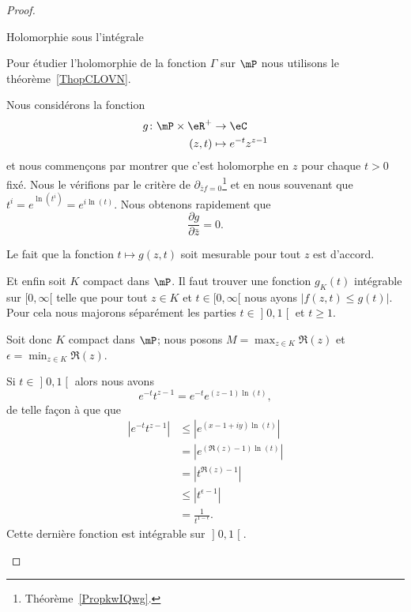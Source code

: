 \begin{proof}
    \begin{subproof}
        \item[Holomorphie sous l'intégrale]

            Pour étudier l'holomorphie de la fonction \( \Gamma\) sur \( \mP\) nous utilisons le théorème~\ref{ThopCLOVN}.

            Nous considérons la fonction
            \begin{equation}
                \begin{aligned}
                    g\colon \mP\times \eR^+&\to \eC \\
                    (z,t)&\mapsto  e^{-t}z^{z-1}
                \end{aligned}
            \end{equation}
            et nous commençons par montrer que c'est holomorphe en \( z\) pour chaque \( t>0\) fixé. Nous le vérifions par le critère de \( \partial_{\bar zf=0}\)\footnote{Théorème~\ref{PropkwIQwg}.} et en nous souvenant que \( t^i= e^{\ln(t^i)}= e^{i\ln(t)}\). Nous obtenons rapidement que
            \begin{equation}
                \frac{ \partial g }{ \partial \bar z }=0.
            \end{equation}

            Le fait que la fonction \( t\mapsto g(z,t)\) soit mesurable pour tout \( z\) est d'accord.

            Et enfin soit \( K\) compact dans \( \mP\). Il faut trouver une fonction \( g_K(t)\) intégrable sur \( \mathopen[ 0 , \infty [\) telle que pour tout \( z\in K\) et \( t\in\mathopen[ 0 , \infty [\) nous ayons \( | f(z,t)\leq g(t) |\). Pour cela nous majorons séparément les parties \( t\in\mathopen] 0 , 1 \mathclose[\) et \( t\geq 1\).

            Soit donc \( K\) compact dans \( \mP\); nous posons \( M=\max_{z\in K}\Re(z)\) et \( \epsilon=\min_{z\in K}\Re(z)\).

            Si \( t\in \mathopen] 0 , 1 \mathclose[\) alors nous avons
            \begin{equation}
                e^{-t}t^{z-1}= e^{-t} e^{(z-1)\ln(t)},
            \end{equation}
            de telle façon à que que
            \begin{subequations}
                \begin{align}
                    |  e^{-t}t^{z-1} |&\leq|  e^{(x-1+iy)\ln(t)} |\\
                    &=|   e^{(\Re(z)-1)\ln(t)} |\\
                    &=| t^{\Re(z)-1} |\\
                    &\leq | t^{\epsilon-1} |\\
                    &=\frac{1}{ t^{1-\epsilon} }.
                \end{align}
            \end{subequations}
            Cette dernière fonction est intégrable sur \( \mathopen] 0 , 1 \mathclose[\).


\end{subproof}
\end{proof}
